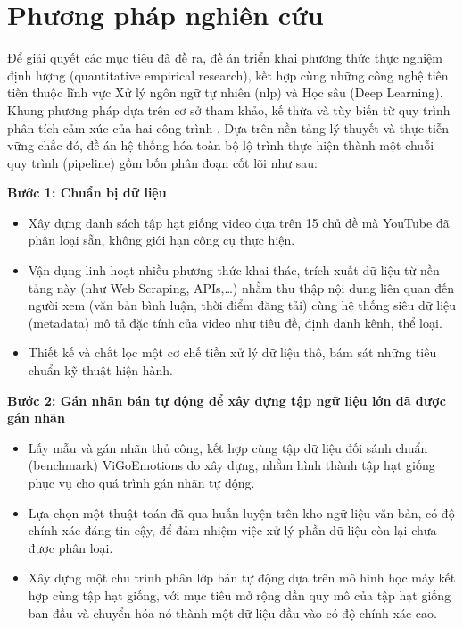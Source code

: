 \section{Phương pháp nghiên cứu}
Để giải quyết các mục tiêu đã đề ra, đề án triển khai phương thức thực nghiệm định lượng (quantitative empirical research), kết hợp cùng những công nghệ tiên tiến thuộc lĩnh vực Xử lý ngôn ngữ tự nhiên (\acrshort{nlp}) và Học sâu (Deep Learning). Khung phương pháp dựa trên cơ sở tham khảo, kế thừa và tùy biến từ quy trình phân tích cảm xúc của hai công trình \parencite{ding2026scope, hung2026vigoemotions}. Dựa trên nền tảng lý thuyết và thực tiễn vững chắc đó, đề án hệ thống hóa toàn bộ lộ trình thực hiện thành một chuỗi quy trình (pipeline) gồm bốn phân đoạn cốt lõi như sau:

\textbf{Bước 1: Chuẩn bị dữ liệu}
\begin{itemize}[label=-]
    \item Xây dựng danh sách tập hạt giống video dựa trên 15 chủ đề mà YouTube đã phân loại sẵn, không giới hạn công cụ thực hiện.
    \item Vận dụng linh hoạt nhiều phương thức khai thác, trích xuất dữ liệu từ nền tảng này (như Web Scraping, APIs,\dots) nhằm thu thập nội dung liên quan đến người xem (văn bản bình luận, thời điểm đăng tải) cùng hệ thống siêu dữ liệu (metadata) mô tả đặc tính của video như tiêu đề, định danh kênh, thể loại.
    \item Thiết kế và chắt lọc một cơ chế tiền xử lý dữ liệu thô, bám sát những tiêu chuẩn kỹ thuật hiện hành.
\end{itemize}

\textbf{Bước 2: Gán nhãn bán tự động để xây dựng tập ngữ liệu lớn đã được gán nhãn}
\begin{itemize}[label=-]
    \item Lấy mẫu và gán nhãn thủ công, kết hợp cùng tập dữ liệu đối sánh chuẩn (benchmark) ViGoEmotions do \textcite{hung2026vigoemotions} xây dựng, nhằm hình thành tập hạt giống phục vụ cho quá trình gán nhãn tự động.
    \item Lựa chọn một thuật toán đã qua huấn luyện trên kho ngữ liệu văn bản, có độ chính xác đáng tin cậy, để đảm nhiệm việc xử lý phần dữ liệu còn lại chưa được phân loại.
    \item Xây dựng một chu trình phân lớp bán tự động dựa trên mô hình học máy kết hợp cùng tập hạt giống, với mục tiêu mở rộng dần quy mô của tập hạt giống ban đầu và chuyển hóa nó thành một dữ liệu đầu vào có độ chính xác cao.
\end{itemize}

